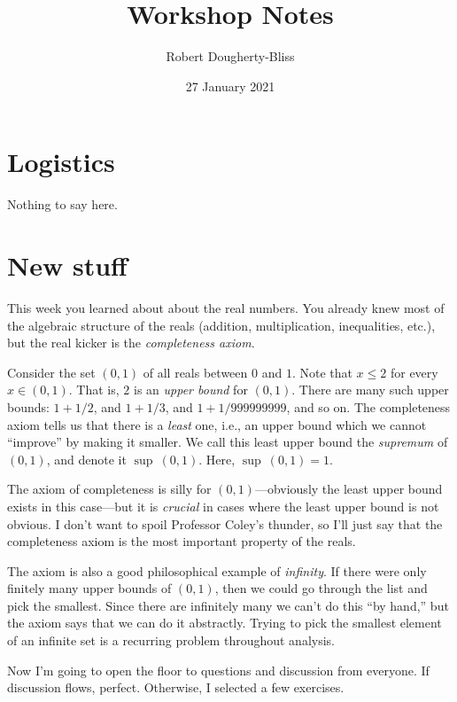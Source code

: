 \documentclass[12pt]{article}
\title{Workshop Notes}
\author{Robert Dougherty-Bliss}
\date{27 January 2021}
\theoremstyle{definition}
\begin{document}
\maketitle

\section*{Logistics}%
\label{sec:logistics}

Nothing to say here.

\section*{New stuff}%
\label{sec:new_stuff}

This week you learned about about the real numbers. You already knew most of
the algebraic structure of the reals (addition, multiplication, inequalities,
etc.), but the real kicker is the \emph{completeness axiom}.

Consider the set $(0, 1)$ of all reals between $0$ and $1$. Note that $x \leq
2$ for every $x \in (0, 1)$. That is, $2$ is an \emph{upper bound} for $(0,
1)$. There are many such upper bounds: $1 + 1/2$, and $1 + 1/3$, and $1
+ 1/999999999$, and so on. The completeness axiom tells us that there is a
\emph{least} one, i.e., an upper bound which we cannot ``improve'' by making it
smaller. We call this least upper bound the \emph{supremum} of $(0, 1)$, and
denote it $\sup\ (0, 1)$. Here, $\sup\ (0, 1) = 1$.

The axiom of completeness is silly for $(0, 1)$---obviously the least upper
bound exists in this case---but it is \emph{crucial} in cases where the least
upper bound is not obvious. I don't want to spoil Professor Coley's thunder, so
I'll just say that the completeness axiom is the most important property of the
reals.

The axiom is also a good philosophical example of \emph{infinity}. If there
were only finitely many upper bounds of $(0, 1)$, then we could go through the
list and pick the smallest. Since there are infinitely many we can't do this
``by hand,'' but the axiom says that we can do it abstractly. Trying to pick
the smallest element of an infinite set is a recurring problem throughout
analysis.

Now I'm going to open the floor to questions and discussion from everyone. If
discussion flows, perfect. Otherwise, I selected a few exercises.
\end{document}
